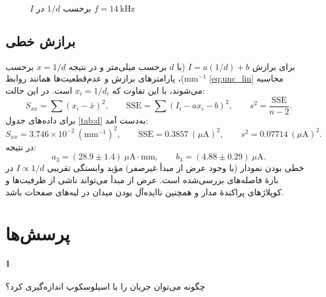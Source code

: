 \documentclass[a4paper, 11pt]{article}
\begin{document}
\begin{figure}[h]
\caption{{$I$ برحسب $1/d$ در $f=14~\mathrm{kHz}$}}
\label{fig:Id}
\centering
{}
\end{figure}

\subsection*{برازش خطی}
برای برازش \(I=a(1/d)+b\) (با \(d\) برحسب میلی‌متر و در نتیجه \(x=1/d\) برحسب \(\mathrm{mm^{-1}}\))، پارامترهای برازش و عدم‌قطعیت‌ها همانند روابط \eqref{eq:unc_lin} محاسبه می‌شوند، با این تفاوت که \(x_i=1/d_i\) است. در این حالت:
\[
S_{xx}=\sum (x_i-\bar x)^2,\qquad
\mathrm{SSE}=\sum (I_i-a x_i-b)^2,\qquad
s^2=\frac{\mathrm{SSE}}{n-2}.
\]
برای داده‌های جدول \ref{tab:d} به‌دست آمد:
\[
S_{xx}=3.746\times 10^{-2}~(\mathrm{mm^{-1}})^2,\qquad
\mathrm{SSE}=0.3857~(\mu\mathrm{A})^2,\qquad
s^2=0.07714~(\mu\mathrm{A})^2.
\]
در نتیجه:
\[
a_3 = (28.9\pm 1.4)\ \mu\mathrm{A\cdot mm},\qquad
b_3 = (4.88\pm 0.29)\ \mu\mathrm{A}.
\]
خطی بودن نمودار (با وجود عرض از مبدأ غیرصفر) مؤید وابستگی تقریبی $I\propto 1/d$ در بازهٔ فاصله‌های بررسی‌شده است. عرض از مبدأ می‌تواند ناشی از ظرفیت‌ها و کوپلاژهای پراکندهٔ مدار و همچنین ناایده‌آل بودن میدان در لبه‌های صفحات باشد.

\section*{پرسش‌ها}

\paragraph{1}
چگونه می‌توان جریان را با اسیلوسکوپ اندازه‌گیری کرد؟
\end{document}
